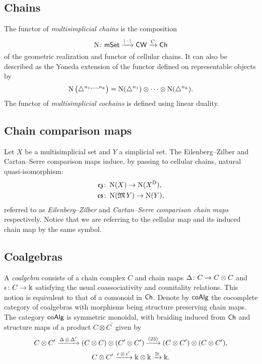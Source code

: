 \subsection{Chains}

The functor of \textit{multisimplicial chains} is the composition
\[
\operatorname{N} \colon \mathsf{mSet} \xrightarrow{\lvert-\rvert} \mathsf{CW} \xrightarrow{\operatorname{C}} \mathsf{Ch}
\]
of the geometric realization and functor of cellular chains.
It can also be described as the Yoneda extension of the functor defined on representable objects by
\[
\operatorname{N} \big( \triangle^{n_1, \dots, n_k} \big) =
\operatorname{N}(\triangle^{n_1}) \otimes \dotsb \otimes \operatorname{N}(\triangle^{n_k}).
\]
The functor of \textit{multisimplicial cochains} is defined using linear duality.

\subsection{Chain comparison maps} \label{ss:comparison chain maps}

Let $X$ be a multisimplicial set and $Y$ a simplicial set.
The Eilenberg--Zilber and Cartan--Serre comparison maps induce, by passing to cellular chains, natural quasi-isomorphism:
\[
\begin{split}
\operatorname{\mathfrak{ez}} &\colon \operatorname{N}(X) \to \operatorname{N}(X^{\mathrm{D}}), \\
\operatorname{\mathfrak{cs}} &\colon \operatorname{N}(\operatorname{\mathfrak{M}} Y) \to \operatorname{N}(Y), \\
\end{split}
\]
referred to as \textit{Eilenberg--Zilber} and \textit{Cartan--Serre comparison chain maps} respectively.
Notice that we are referring to the cellular map and its induced chain map by the same symbol.

\subsection{Coalgebras} \label{ss:coalgebras}

A \textit{coalgebra} consists of a chain complex $C$ and chain maps $\operatorname{\Delta} \colon C \to C \otimes C$ and $\operatorname{\epsilon} \colon C \to \Bbbk$ satisfying the usual coassociativity and counitality relations.
This notion is equivalent to that of a comonoid in $\mathsf{Ch}$.
Denote by $\mathsf{coAlg}$ the cocomplete category of coalgebras with morphisms being structure preserving chain maps.
The category $\mathsf{coAlg}$ is symmetric monoidal, with braiding induced from $\mathsf{Ch}$ and structure maps of a product $C \otimes C^\prime$ given by
\begin{gather*}
C \otimes C^\prime \xrightarrow{\operatorname{\Delta} \otimes \operatorname{\Delta}^\prime}
(C \otimes C) \otimes (C^\prime \otimes C^\prime) \xrightarrow{(23)}
(C \otimes C^\prime) \otimes (C \otimes C^\prime), \\
C \otimes C^\prime \xrightarrow{\operatorname{\epsilon} \otimes \operatorname{\epsilon}^\prime}
\Bbbk \otimes \Bbbk \xrightarrow{\cong} \Bbbk.
\end{gather*}

